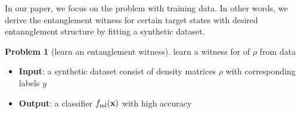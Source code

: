 \documentclass[
aps,
pra,
twocolumn,
floatfix,
]{revtex4-2}
\theoremstyle{plain}
\theoremstyle{definition}
\newtheorem{problem}{Problem}
\newcommand{\dm}{\rho}
\newcommand{\ml}{\text{ml}}
\begin{document}
In our paper, we focus on the problem  with training data.
In other words, we derive the entanglement witness for certain target states with desired entannglement structure by fitting a synthetic dataset.
\begin{problem}[learn an entanglement witness]\label{prm:learn_witness}
	learn a witness for  of $\dm$ from data
	\begin{itemize}
		\item \textbf{Input}: a synthetic dataset consist of density matrices $\dm$ with corresponding labels $y$
		\item \textbf{Output}: a classifier $f_{\ml}(\vbx)$ with high accuracy
	\end{itemize}
\end{problem}


\end{document}
